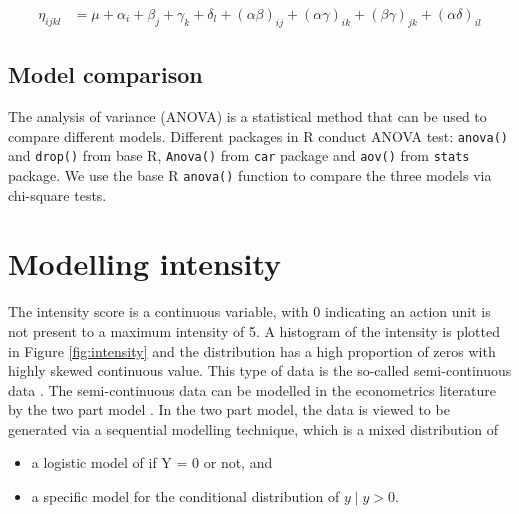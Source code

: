 \documentclass{monashthesis}
\begin{document}
\begin{align}\label{eq:judge_speaker}
\eta_{ijkl} &= \mu + \alpha_i + \beta_j +\gamma_k + \delta_l + (\alpha\beta)_{ij} + (\alpha\gamma)_{ik} + (\beta\gamma)_{jk} + (\alpha\delta)_{il}
\end{align}

\hypertarget{model-comparison}{%
\subsection{Model comparison}\label{model-comparison}}

The analysis of variance (ANOVA) \autocites{faraway2016extending}{gelman2006data} is a statistical method that can be used to compare different models. Different packages in R conduct ANOVA test: \texttt{anova()} and \texttt{drop()} from base R, \texttt{Anova()} from \texttt{car} package and \texttt{aov()} from \texttt{stats} package. We use the base R \texttt{anova()} function to compare the three models via chi-square tests.

\hypertarget{modelling-intensity}{%
\section{Modelling intensity}\label{modelling-intensity}}

The intensity score is a continuous variable, with 0 indicating an action unit is not present to a maximum intensity of 5. A histogram of the intensity is plotted in Figure \ref{fig:intensity} and the distribution has a high proportion of zeros with highly skewed continuous value. This type of data is the so-called semi-continuous data \autocite{twopart2010}. The semi-continuous data can be modelled in the econometrics literature by the two part model \autocite{cragg1971some}. In the two part model, the data is viewed to be generated via a sequential modelling technique, which is a mixed distribution of

\begin{itemize}
\tightlist
\item
  a logistic model of if Y = 0 or not, and
\item
  a specific model for the conditional distribution of \(y \mid y > 0\).
\end{itemize}
\end{document}
